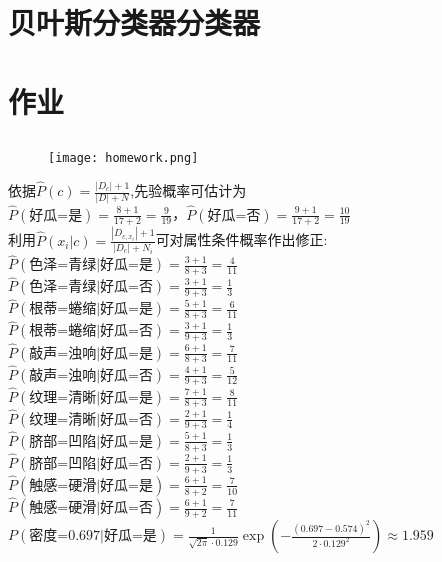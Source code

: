 \documentclass[12pt, a4paper, oneside]{ctexart}
\begin{document}
\section{贝叶斯分类器分类器}
\newpage
\section{作业}
\subsection{}
\begin{figure}[H]
    \centering
    \texttt{[image: homework.png]}
\end{figure}
\par 依据$\widehat{P}(c)=\frac{|D_c|+1}{|D|+N}$,先验概率可估计为 
\\ $\widehat{P}(\mbox{好瓜=是})=\frac{8+1}{17+2}=\frac{9}{19}$，$\widehat{P}(\mbox{好瓜=否})=\frac{9+1}{17+2}=\frac{10}{19}$
\\ 利用$\widehat{P}(x_i|c)=\frac{|D_{c,x_i}|+1}{|D_c|+N_i}$可对属性条件概率作出修正:
\\ $\widehat{P}(\mbox{色泽=青绿|好瓜=是})=\frac{3+1}{8+3}=\frac{4}{11}$
\\ $\widehat{P}(\mbox{色泽=青绿|好瓜=否})=\frac{3+1}{9+3}=\frac{1}{3}$
\\ $\widehat{P}(\mbox{根蒂=蜷缩|好瓜=是})=\frac{5+1}{8+3}=\frac{6}{11}$
\\ $\widehat{P}(\mbox{根蒂=蜷缩|好瓜=否})=\frac{3+1}{9+3}=\frac{1}{3}$
\\ $\widehat{P}(\mbox{敲声=浊响|好瓜=是})=\frac{6+1}{8+3}=\frac{7}{11}$
\\ $\widehat{P}(\mbox{敲声=浊响|好瓜=否})=\frac{4+1}{9+3}=\frac{5}{12}$
\\ $\widehat{P}(\mbox{纹理=清晰|好瓜=是})=\frac{7+1}{8+3}=\frac{8}{11}$
\\ $\widehat{P}(\mbox{纹理=清晰|好瓜=否})=\frac{2+1}{9+3}=\frac{1}{4}$
\\ $\widehat{P}(\mbox{脐部=凹陷|好瓜=是})=\frac{5+1}{8+3}=\frac{1}{3}$
\\ $\widehat{P}(\mbox{脐部=凹陷|好瓜=否})=\frac{2+1}{9+3}=\frac{1}{3}$
\\ $\widehat{P}(\mbox{触感=硬滑|好瓜=是})=\frac{6+1}{8+2}=\frac{7}{10}$
\\ $\widehat{P}(\mbox{触感=硬滑|好瓜=否})=\frac{6+1}{9+2}=\frac{7}{11}$
\\ $P(\mbox{密度=0.697|好瓜=是})=\frac{1}{\sqrt{2\pi}\cdot 0.129}\exp(-\frac{(0.697-0.574)^2}{2\cdot {0.129}^2})\approx 1.959$
\end{document}
